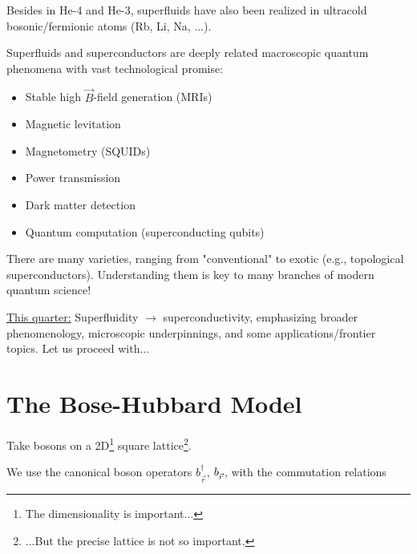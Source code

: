 \documentclass{article}
\newcommand{\egreg}{\vphantom{-}} %
\begin{document}
Besides in He-4 and He-3, superfluids have also been realized in ultracold bosonic/fermionic atoms (Rb, Li, Na, ...).




Superfluids and superconductors are deeply related macroscopic quantum phenomena with vast technological promise:
\begin{itemize}
    \item Stable high $\vec{B}$-field generation (MRIs)
    \item Magnetic levitation
    \item Magnetometry (SQUIDs)
    \item Power transmission
    \item Dark matter detection
    \item Quantum computation (superconducting qubits)          
\end{itemize}

There are many varieties, ranging from "conventional" to exotic (e.g., topological superconductors). Understanding them is key to many branches of modern quantum science!

\underline{This quarter:} Superfluidity $\rightarrow$ superconductivity, emphasizing broader phenomenology, microscopic underpinnings, and some applications/frontier topics. Let us proceed with...

\section{The Bose-Hubbard Model}\label{The Bose-Hubbard Model} 

Take bosons on a 2D\footnote{The dimensionality is important...} square lattice\footnote{...But the precise lattice is not so important.}.


We use the canonical boson operators $b_{\vec{r}}^{\dagger}$, $b_{\vec{r}}^{\egreg}$, with the commutation relations
\end{document}
